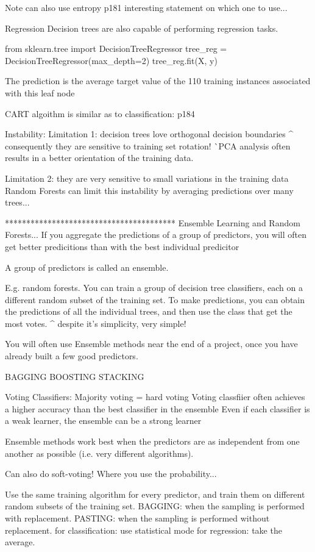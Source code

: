 Note can also use entropy p181
interesting statement on which one to use...

Regression
Decision trees are also capable of performing regression tasks.

from sklearn.tree import DecisionTreeRegressor
tree_reg = DecisionTreeRegressor(max_depth=2)
tree_reg.fit(X, y)

The prediction is the average target value of the
110 training instances associated with this leaf node

CART algoithm is similar as to classification: p184

Instability:
Limitation 1: decision trees love orthogonal decision boundaries
^ consequently they are sensitive to training set rotation!
^^ PCA analysis often results in a better orientation of the training data.

Limitation 2: they are very sensitive to small variations in the training data
Random Forests can limit this instability by averaging predictions over many trees...

****************************************
Ensemble Learning and Random Forests...
If you aggregate the predictions of a group of predictors,
you will often get better predicitions than with the best individual predicitor

A group of predictors is called an ensemble.

E.g. random forests.
You can train a group of decision tree classifiers,
each on a different random subset of the training set.
To make predictions, you can obtain the predictions of all the individual trees,
and then use the class that get the most votes.
^ despite it's simplicity, very simple!

You will often use Ensemble methods near the end of a project,
once you have already built a few good predictors.

BAGGING
BOOSTING
STACKING

Voting Classifiers:
Majority voting = hard voting
Voting classfiier often achieves a higher accuracy than the best classifier in the ensemble
Even if each classifier is a weak learner,
the ensemble can be a strong learner

Ensemble methods work best when the predictors are
as independent from one another as possible (i.e. very different algorithms).

Can also do soft-voting! Where you use the probability...


Use the same training algorithm for every predictor,
and train them on different random subsets of the training set.
BAGGING: when the sampling is performed with replacement.
PASTING: when the sampling is performed without replacement.
for classification: use statistical mode
for regression: take the average.

